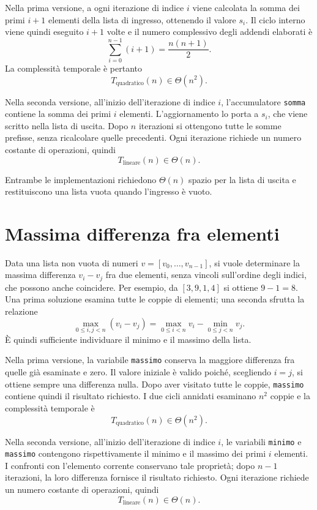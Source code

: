 

Nella prima versione, a ogni iterazione di indice \(i\) viene
calcolata la somma dei primi \(i+1\) elementi della lista di ingresso,
ottenendo il valore \(s_i\). Il ciclo interno viene quindi eseguito
\(i+1\) volte e il numero complessivo degli addendi elaborati è
\[
  \sum_{i=0}^{n-1}(i+1)=\frac{n(n+1)}2.
\]
La complessità temporale è pertanto
\[
  T_{\mathrm{quadratico}}(n)\in\Theta(n^2).
\]

Nella seconda versione, all'inizio dell'iterazione di indice \(i\),
l'accumulatore \texttt{somma} contiene la somma dei primi \(i\)
elementi. L'aggiornamento lo porta a \(s_i\), che viene scritto
nella lista di uscita. Dopo \(n\) iterazioni si ottengono tutte
le somme prefisse, senza ricalcolare quelle precedenti.
Ogni iterazione richiede un numero costante di operazioni, quindi
\[
  T_{\mathrm{lineare}}(n)\in\Theta(n).
\]

Entrambe le implementazioni richiedono \(\Theta(n)\) spazio per
la lista di uscita e restituiscono una lista vuota quando
l'ingresso è vuoto.

\section{Massima differenza fra elementi}
\label{sec:fi-complessita-differenza}

Data una lista non vuota di numeri \(v=[v_0,\ldots,v_{n-1}]\), si
vuole determinare la massima differenza \(v_i-v_j\) fra due elementi,
senza vincoli sull'ordine degli indici, che possono anche coincidere.
Per esempio, da \([3,9,1,4]\) si ottiene \(9-1=8\).
Una prima soluzione esamina tutte le coppie di elementi; una seconda
sfrutta la relazione
\[
  \max_{0\le i,j<n}(v_i-v_j)
  =\max_{0\le i<n}v_i-\min_{0\le j<n}v_j.
\]
È quindi sufficiente individuare il minimo e il massimo della lista.



Nella prima versione, la variabile \texttt{massimo} conserva la
maggiore differenza fra quelle già esaminate e zero. Il valore
iniziale è valido poiché, scegliendo \(i=j\), si ottiene sempre
una differenza nulla. Dopo aver visitato tutte le coppie,
\texttt{massimo} contiene quindi il risultato richiesto.
I due cicli annidati esaminano \(n^2\) coppie e la complessità
temporale è
\[
  T_{\mathrm{quadratico}}(n)\in\Theta(n^2).
\]

Nella seconda versione, all'inizio dell'iterazione di indice \(i\),
le variabili \texttt{minimo} e \texttt{massimo} contengono
rispettivamente il minimo e il massimo dei primi \(i\) elementi.
I confronti con l'elemento corrente conservano tale proprietà;
dopo \(n-1\) iterazioni, la loro differenza fornisce il risultato
richiesto. Ogni iterazione richiede un numero costante di operazioni,
quindi
\[
  T_{\mathrm{lineare}}(n)\in\Theta(n).
\]

